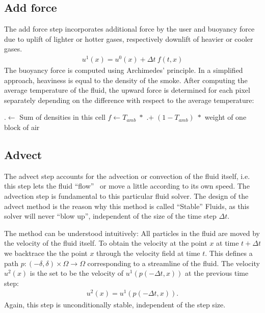 \documentclass[a4paper,10pt,oneside,final,german,openbib,pdftex,titlepage]{scrbook}
\begin{document}
\subsection{Add force}
The add force step incorporates additional force by the user and buoyancy force due to uplift of lighter or hotter gases, respectively downlift of heavier or cooler gases.
\begin{align*}
	u^1(x) = u^0(x) + \Delta t~ f(t,x)
\end{align*}
The buoyancy force is computed using Archimedes' principle. In a simplified approach, heaviness is equal to the density of the smoke. After computing the average temperature of the fluid, the upward force is determined for each pixel separately depending on the difference with respect to the average temperature:
\begin{algorithm}
\DontPrintSemicolon
{
	\cell.\weight $\leftarrow$ Sum of densities in this cell\;
	$f\leftarrow T_{amb} \;*$ \cell.\weight $ +\; (1-T_{amb}) \;* $ weight of one block of air\;
}
\end{algorithm}

\subsection{Advect}
The advect step accounts for the advection or convection of the fluid itself, i.e. this step lets the fluid ``flow'' ~or move a little according to its own speed.
The advection step is fundamental to this particular fluid solver. The design of the advect method is the reason why this method is called ``Stable'' Fluids, as this solver will never ``blow up'', independent of the size of the time step $\Delta t$. 

The method can be understood intuitively: All particles in the fluid are moved by the velocity of the fluid itself. To obtain the velocity at the point $x$ at time $t + \Delta t$ we backtrace the the point $x$ through the velocity field at time $t$. This defines a path $p: (-\delta,\delta) \times \Omega \rightarrow \Omega$ corresponding to a streamline of the fluid. The velocity $u^2(x)$ is the set to be the velocity of $u^1(p(-\Delta t,x))$ at the previous time step:
\begin{align*}
	u^2(x) = u^1(p(-\Delta t,x)).
\end{align*}
Again, this step is unconditionally stable, independent of the step size. \\
\end{document}
